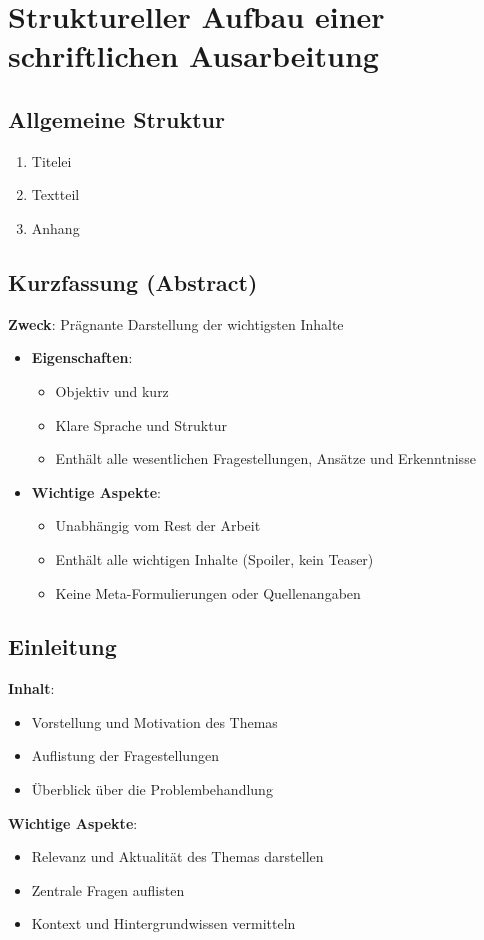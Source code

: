 \documentclass[a4paper,12pt]{article}
\begin{document}
\section{Struktureller Aufbau einer schriftlichen Ausarbeitung}

\subsection{Allgemeine Struktur}
\begin{enumerate}
    \item Titelei
    \item Textteil
    \item Anhang
\end{enumerate}

\subsection{Kurzfassung (Abstract)}
\textbf{Zweck}: Prägnante Darstellung der wichtigsten Inhalte
\begin{itemize}
    \item \textbf{Eigenschaften}:
    \begin{itemize}
        \item Objektiv und kurz
        \item Klare Sprache und Struktur
        \item Enthält alle wesentlichen Fragestellungen, Ansätze und Erkenntnisse
    \end{itemize}
    \item \textbf{Wichtige Aspekte}:
    \begin{itemize}
        \item Unabhängig vom Rest der Arbeit
        \item Enthält alle wichtigen Inhalte (Spoiler, kein Teaser)
        \item Keine Meta-Formulierungen oder Quellenangaben
    \end{itemize}
\end{itemize}

\subsection{Einleitung}
\textbf{Inhalt}:
\begin{itemize}
    \item Vorstellung und Motivation des Themas
    \item Auflistung der Fragestellungen
    \item Überblick über die Problembehandlung
\end{itemize}
\textbf{Wichtige Aspekte}:
\begin{itemize}
    \item Relevanz und Aktualität des Themas darstellen
    \item Zentrale Fragen auflisten
    \item Kontext und Hintergrundwissen vermitteln
\end{itemize}
\end{document}
